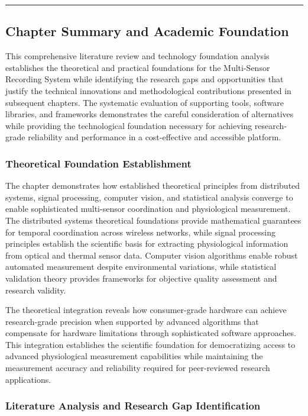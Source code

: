 \documentclass[11pt,a4paper]{report}
\begin{document}
\hrule

\subsection{Chapter Summary and Academic Foundation}

This comprehensive literature review and technology foundation analysis establishes the theoretical and practical
foundations for the Multi-Sensor Recording System while identifying the research gaps and opportunities that justify the
technical innovations and methodological contributions presented in subsequent chapters. The systematic evaluation of
supporting tools, software libraries, and frameworks demonstrates the careful consideration of alternatives while
providing the technological foundation necessary for achieving research-grade reliability and performance in a
cost-effective and accessible platform.

\subsubsection{Theoretical Foundation Establishment}

The chapter demonstrates how established theoretical principles from distributed systems, signal processing, computer
vision, and statistical analysis converge to enable sophisticated multi-sensor coordination and physiological
measurement. The distributed systems theoretical foundations provide mathematical guarantees for temporal coordination
across wireless networks, while signal processing principles establish the scientific basis for extracting physiological
information from optical and thermal sensor data. Computer vision algorithms enable robust automated measurement despite
environmental variations, while statistical validation theory provides frameworks for objective quality assessment and
research validity.

The theoretical integration reveals how consumer-grade hardware can achieve research-grade precision when supported by
advanced algorithms that compensate for hardware limitations through sophisticated software approaches. This integration
establishes the scientific foundation for democratizing access to advanced physiological measurement capabilities while
maintaining the measurement accuracy and reliability required for peer-reviewed research applications.

\subsubsection{Literature Analysis and Research Gap Identification}
\end{document}
